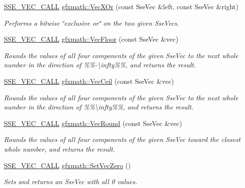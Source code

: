 \begin{DoxyCompactItemize}
\hyperlink{ssevec__math__defs_8h_a97454f977a5281455cecacce1e8ba670}{S\+S\+E\+\_\+\+V\+E\+C\+\_\+\+C\+A\+L\+L} \hyperlink{group___s_i_m_d_vec_math_ga70ec37b7265f71dba48c5c24721bcd6b}{gfxmath\+::\+Vec\+X\+Or} (const Sse\+Vec \&left, const Sse\+Vec \&right)
\begin{DoxyCompactList}\small\item\em Performs a bitwise \char`\"{}exclusive or\char`\"{} on the two given Sse\+Vecs. \end{DoxyCompactList}\item 
\hyperlink{ssevec__math__defs_8h_a97454f977a5281455cecacce1e8ba670}{S\+S\+E\+\_\+\+V\+E\+C\+\_\+\+C\+A\+L\+L} \hyperlink{group___s_i_m_d_vec_math_gadf0a64c2df9c60c9e8ce9cfa107bdff6}{gfxmath\+::\+Vec\+Floor} (const Sse\+Vec \&vec)
\begin{DoxyCompactList}\small\item\em Rounds the values of all four components of the given Sse\+Vec to the next whole number in the direction of \%\%-\/\textbackslash{}infty\%\%, and returns the result. \end{DoxyCompactList}\item 
\hyperlink{ssevec__math__defs_8h_a97454f977a5281455cecacce1e8ba670}{S\+S\+E\+\_\+\+V\+E\+C\+\_\+\+C\+A\+L\+L} \hyperlink{group___s_i_m_d_vec_math_ga16c13f89dca63e476b9650929065cc12}{gfxmath\+::\+Vec\+Ceil} (const Sse\+Vec \&vec)
\begin{DoxyCompactList}\small\item\em Rounds the values of all four components of the given Sse\+Vec to the next whole number in the direction of \%\%\textbackslash{}infty\%\%, and returns the result. \end{DoxyCompactList}\item 
\hyperlink{ssevec__math__defs_8h_a97454f977a5281455cecacce1e8ba670}{S\+S\+E\+\_\+\+V\+E\+C\+\_\+\+C\+A\+L\+L} \hyperlink{group___s_i_m_d_vec_math_gafc1364d5e549d2acc145311d3ea882fe}{gfxmath\+::\+Vec\+Round} (const Sse\+Vec \&vec)
\begin{DoxyCompactList}\small\item\em Rounds the values of all four components of the given Sse\+Vec toward the closest whole number, and returns the result. \end{DoxyCompactList}\item 
\hyperlink{ssevec__math__defs_8h_a97454f977a5281455cecacce1e8ba670}{S\+S\+E\+\_\+\+V\+E\+C\+\_\+\+C\+A\+L\+L} \hyperlink{group___s_i_m_d_vec_math_ga0f2e48ba414195d54e2edc5d73b829b0}{gfxmath\+::\+Set\+Vec\+Zero} ()
\begin{DoxyCompactList}\small\item\em Sets and returns an Sse\+Vec with all 0 values. \end{DoxyCompactList}\item 

\end{DoxyCompactItemize}

